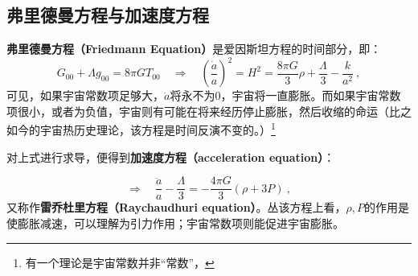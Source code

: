 \subsection{弗里德曼方程与加速度方程}

\textbf{弗里德曼方程（Friedmann Equation）}是爱因斯坦方程的时间部分，即：
\begin{equation}G_{00}+\Lambda g_{00}=8\pi GT_{00}\quad\Rightarrow\quad\left(\frac{\dot{a}}{a}\right)^2=H^2=\frac{8\pi G}{3}\rho+\frac{\Lambda}{3}-\frac{k}{a^2}~,\end{equation}
可见，如果宇宙常数项足够大，$\dot a$将永不为0，宇宙将一直膨胀。而如果宇宙常数项很小，或者为负值，宇宙则有可能在将来经历停止膨胀，然后收缩的命运（比之如今的宇宙热历史理论，该方程是时间反演不变的。）\footnote{有一个理论是宇宙常数并非“常数”，}

对上式进行求导，便得到\textbf{加速度方程（acceleration equation）}：

\begin{equation}
\Rightarrow\quad\frac{\ddot{a}}{a}-\frac{\Lambda}{3}=-\frac{4\pi G}{3}(\rho+3P)~,
\end{equation}
又称作\textbf{雷乔杜里方程（Raychaudhuri equation）}。丛该方程上看，$\rho,P$的作用是使膨胀减速，可以理解为引力作用；宇宙常数项则能促进宇宙膨胀。

